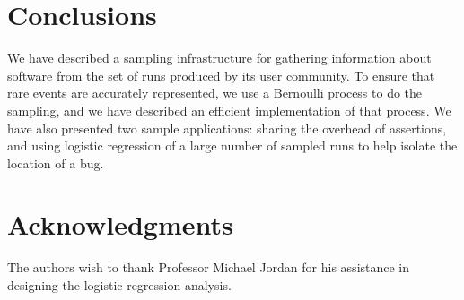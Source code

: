 \section{Conclusions}
\label{sec:conclusions}

We have described a sampling infrastructure for gathering information about
software from the set of runs produced by its user community.  To ensure
that rare events are accurately represented, we use a Bernoulli process to do the sampling,
and we have described an efficient implementation of that process.
We have also presented two sample applications: sharing the overhead of assertions, and 
using logistic regression of a large number of sampled runs to help isolate
the location of a bug.

\section{Acknowledgments}

The authors wish to thank Professor Michael Jordan for his assistance
in designing the logistic regression analysis.

